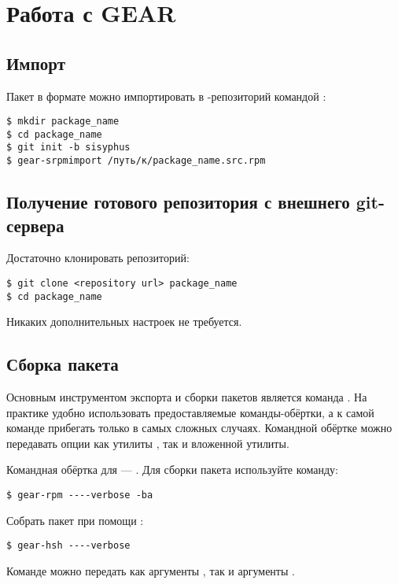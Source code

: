 \section{Работа с GEAR}

\subsection*{Импорт }

Пакет в формате  можно импортировать в -репозиторий командой :
\begin{verbatim}
$ mkdir package_name
$ cd package_name
$ git init -b sisyphus
$ gear-srpmimport /путь/к/package_name.src.rpm
\end{verbatim}

\subsection*{Получение готового репозитория с внешнего git-сервера}

Достаточно клонировать репозиторий:
\begin{verbatim}
$ git clone <repository url> package_name
$ cd package_name
\end{verbatim}
Никаких дополнительных настроек не требуется.

\subsection*{Сборка пакета}

Основным инструментом экспорта и сборки пакетов является команда . На практике удобно
использовать предоставляемые команды-обёртки, а к самой команде  прибегать только в
самых сложных случаях. Командной обёртке можно передавать опции как утилиты , так и
вложенной утилиты.

Командная обёртка  для  --- . Для сборки пакета используйте команду:
\begin{verbatim}
$ gear-rpm ----verbose -ba
\end{verbatim}


Собрать пакет при помощи :
\begin{verbatim}
$ gear-hsh ----verbose
\end{verbatim}

Команде  можно передать как аргументы , так и аргументы .

